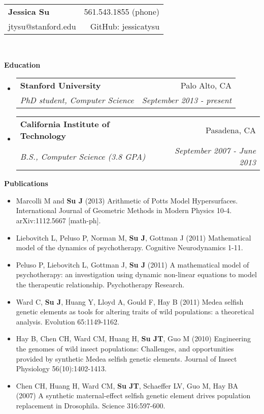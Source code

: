 \documentclass[letterpaper,11pt]{article}
\makeatletter
\newcommand{\resheading}[1]{{\large \colorbox{mygrey}{\begin{minipage}{\textwidth}{\textbf{#1 \vphantom{p\^{E}}}}\end{minipage}}}}
\newcommand{\ressubheading}[4]{
\begin{tabular*}{7.0in}{l@{\extracolsep{\fill}}r}
		\textbf{#1} & #2 \\
		\textit{#3} & \textit{#4} \\
\end{tabular*}\vspace{-6pt}}
\makeatother
\begin{document}
\begin{tabular*}{7.5in}{l@{\extracolsep{\fill}}r}
\textbf{\large Jessica Su}  & 561.543.1855 (phone)\\
jtysu@stanford.edu & GitHub: jessicatysu \\
\end{tabular*}
\\

\vspace{0.1in}

\resheading{Education}
\begin{itemize}
\item
	\ressubheading{Stanford University}{Palo Alto, CA}{PhD student, Computer Science}{September 2013 - present}
\item
	\ressubheading{California Institute of Technology}{Pasadena, CA}{B.S., Computer Science (3.8 GPA)}{September 2007 - June 2013}

\end{itemize}

\resheading{Publications}
\begin{itemize}
	\item Marcolli M and \textbf{Su J} (2013) Arithmetic of Potts Model Hypersurfaces.  International Journal of Geometric Methods in Modern Physics 10-4.  arXiv:1112.5667 [math-ph].
	\item Liebovitch L, Peluso P, Norman M, \textbf{Su J}, Gottman J (2011) Mathematical model of the dynamics of psychotherapy.  Cognitive Neurodynamics 1-11.
	\item Peluso P, Liebovitch L, Gottman J, \textbf{Su J} (2011) A mathematical model of psychotherapy: an investigation using dynamic non-linear equations to model the therapeutic relationship.  Psychotherapy Research.
	\item Ward C, \textbf{Su J}, Huang Y, Lloyd A, Gould F, Hay B (2011) Medea selfish genetic elements as tools for altering traits of wild populations: a theoretical analysis.  Evolution 65:1149-1162.
	\item Hay B, Chen CH, Ward CM, Huang H, \textbf{Su JT}, Guo M (2010) Engineering the genomes of wild insect populations: Challenges, and opportunities provided by synthetic Medea selfish genetic elements.  Journal of Insect Physiology 56(10):1402-1413.
	\item Chen CH, Huang H, Ward CM, \textbf{Su JT}, Schaeffer LV, Guo M, Hay BA (2007) A synthetic maternal-effect selfish genetic element drives population replacement in Drosophila. Science 316:597-600.
\end{itemize}
\end{document}
